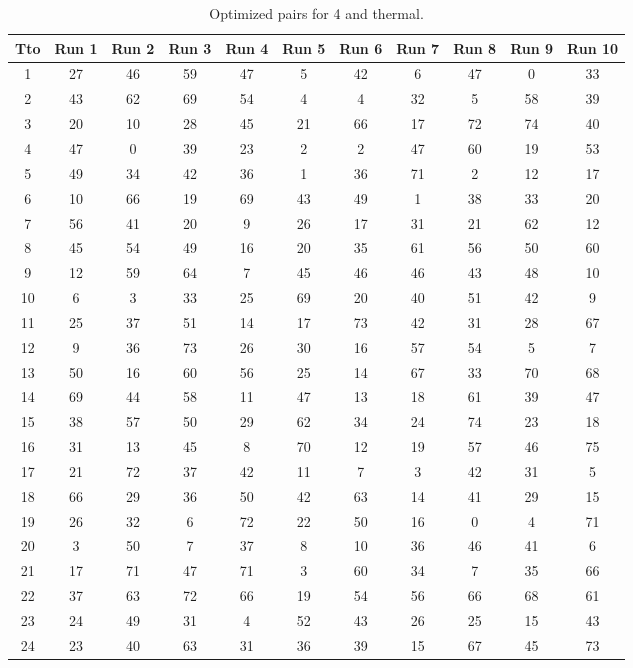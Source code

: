 \begin{table}
  \centering
  \scriptsize
  \caption{Optimized pairs for 4 and thermal.}
  \label{tab_pairs}
\begin{tabular}{c c c c c c c c c c c }
\hline
Tto & Run 1 & Run 2 & Run 3 & Run 4 & Run 5 & Run 6 & Run 7 & Run 8 & Run 9 & Run 10 \\
\hline
1 & 27 & 46 & 59 & 47 & 5 & 42 & 6 & 47 & 0 & 33 \\
2 & 43 & 62 & 69 & 54 & 4 & 4 & 32 & 5 & 58 & 39 \\
3 & 20 & 10 & 28 & 45 & 21 & 66 & 17 & 72 & 74 & 40 \\
4 & 47 & 0 & 39 & 23 & 2 & 2 & 47 & 60 & 19 & 53 \\
5 & 49 & 34 & 42 & 36 & 1 & 36 & 71 & 2 & 12 & 17 \\
6 & 10 & 66 & 19 & 69 & 43 & 49 & 1 & 38 & 33 & 20 \\
7 & 56 & 41 & 20 & 9 & 26 & 17 & 31 & 21 & 62 & 12 \\
8 & 45 & 54 & 49 & 16 & 20 & 35 & 61 & 56 & 50 & 60 \\
9 & 12 & 59 & 64 & 7 & 45 & 46 & 46 & 43 & 48 & 10 \\
10 & 6 & 3 & 33 & 25 & 69 & 20 & 40 & 51 & 42 & 9 \\
11 & 25 & 37 & 51 & 14 & 17 & 73 & 42 & 31 & 28 & 67 \\
12 & 9 & 36 & 73 & 26 & 30 & 16 & 57 & 54 & 5 & 7 \\
13 & 50 & 16 & 60 & 56 & 25 & 14 & 67 & 33 & 70 & 68 \\
14 & 69 & 44 & 58 & 11 & 47 & 13 & 18 & 61 & 39 & 47 \\
15 & 38 & 57 & 50 & 29 & 62 & 34 & 24 & 74 & 23 & 18 \\
16 & 31 & 13 & 45 & 8 & 70 & 12 & 19 & 57 & 46 & 75 \\
17 & 21 & 72 & 37 & 42 & 11 & 7 & 3 & 42 & 31 & 5 \\
18 & 66 & 29 & 36 & 50 & 42 & 63 & 14 & 41 & 29 & 15 \\
19 & 26 & 32 & 6 & 72 & 22 & 50 & 16 & 0 & 4 & 71 \\
20 & 3 & 50 & 7 & 37 & 8 & 10 & 36 & 46 & 41 & 6 \\
21 & 17 & 71 & 47 & 71 & 3 & 60 & 34 & 7 & 35 & 66 \\
22 & 37 & 63 & 72 & 66 & 19 & 54 & 56 & 66 & 68 & 61 \\
23 & 24 & 49 & 31 & 4 & 52 & 43 & 26 & 25 & 15 & 43 \\
24 & 23 & 40 & 63 & 31 & 36 & 39 & 15 & 67 & 45 & 73 \\

\end{tabular}
\end{table}
